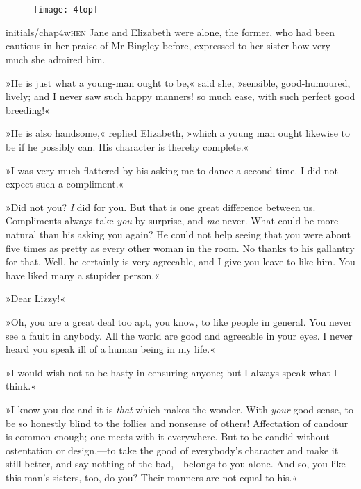 
\chapter[Chapter \thechapter]{}
\begin{figure}[t!]
\centering
\texttt{[image: 4top]}
\end{figure}

\lettrine[lines=6,image=true]{initials/chap4w}{hen}  Jane and Elizabeth were alone, the former, who had been cautious in her praise of Mr Bingley before, expressed to her sister how very much she admired him.

\zz
»He is just what a young-man ought to be,« said she, »sensible, good-humoured, lively; and I never saw such happy manners! so much ease, with such perfect good breeding!«

»He is also handsome,« replied Elizabeth, »which a young man ought likewise to be if he possibly can. His character is thereby complete.«

»I was very much flattered by his asking me to dance a second time. I did not expect such a compliment.«

»Did not you? \textit{I} did for you. But that is one great difference between us. Compliments always take \textit{you} by surprise, and \textit{me} never. What could be more natural than his asking you again? He could not help seeing that you were about five times as pretty as every other woman in the room. No thanks to his gallantry for that. Well, he certainly is very agreeable, and I give you leave to like him. You have liked many a stupider person.«

»Dear Lizzy!«

»Oh, you are a great deal too apt, you know, to like people in general. You never see a fault in anybody. All the world are good and agreeable in your eyes. I never heard you speak ill of a human being in my life.«

»I would wish not to be hasty in censuring anyone; but I always speak what I think.«

»I know you do: and it is \textit{that} which makes the wonder. With \textit{your} good sense, to be so honestly blind to the follies and nonsense of others! Affectation of candour is common enough; one meets with it everywhere. But to be candid without ostentation or design,—to take the good of everybody's character and make it still better, and say nothing of the bad,—belongs to you alone. And so, you like this man's sisters, too, do you? Their manners are not equal to his.«

